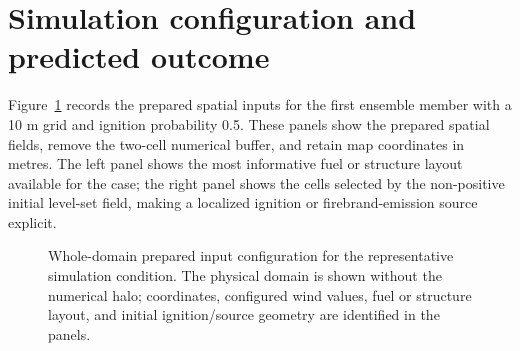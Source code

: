 \section{Simulation configuration and predicted outcome}

Figure~\ref{fig:input-configuration} records the prepared spatial inputs for the first ensemble member with a 10 m grid and ignition probability 0.5.
These panels show the prepared spatial fields, remove the
two-cell numerical buffer, and retain map coordinates in metres.  The left panel shows
the most informative fuel or structure layout available for the case; the right panel
shows the cells selected by the non-positive initial level-set field, making a localized
ignition or firebrand-emission source explicit.

\begin{figure}[H]
\centering
{}
\caption{Whole-domain prepared input configuration for the representative simulation condition.  The
physical domain is shown without the numerical halo; coordinates, configured wind values,
fuel or structure layout, and initial ignition/source geometry are identified in the panels.}
\label{fig:input-configuration}
\end{figure}

